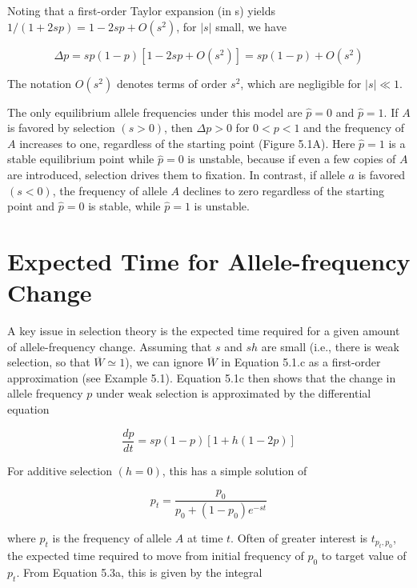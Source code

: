\documentclass{article}
\begin{document}
Noting that a first-order Taylor expansion (in s) yields  $ 1/(1+2sp)=1-2sp+O(s^{2}) $, for  $ |s| $ small, we have

\begin{equation}
\Delta p=sp(1-p)\left[1-2sp+O(s^{2})\right]=sp(1-p)+O(s^{2})
\tag{5.2b}
\label{eq:5_2b}
\end{equation}

The notation  $ O(s^2) $ denotes terms of order  $ s^2 $, which are negligible for  $ |s| \ll 1 $.

The only equilibrium allele frequencies under this model are  $ \hat{p} = 0 $ and  $ \hat{p} = 1 $. If  $ A $ is favored by selection  $ (s > 0) $, then  $ \Delta p > 0 $ for  $ 0 < p < 1 $ and the frequency of  $ A $ increases to one, regardless of the starting point (Figure 5.1A). Here  $ \hat{p} = 1 $ is a stable equilibrium point while  $ \hat{p} = 0 $ is unstable, because if even a few copies of  $ A $ are introduced, selection drives them to fixation. In contrast, if allele  $ a $ is favored  $ (s < 0) $, the frequency of allele  $ A $ declines to zero regardless of the starting point and  $ \hat{p} = 0 $ is stable, while  $ \hat{p} = 1 $ is unstable.

\section{Expected Time for Allele-frequency Change}
A key issue in selection theory is the expected time required for a given amount of allele-frequency change. Assuming that $s$ and $sh$ are small (i.e., there is weak selection, so that $\overline{W} \simeq 1$), we can ignore $\overline{W}$ in Equation 5.1.c as a first-order approximation (see Example 5.1). Equation 5.1c then shows that the change in allele frequency $p$ under weak selection is approximated by the differential equation

\begin{equation}
\frac{dp}{dt}=sp(1-p)[1+h(1-2p)]
\tag{5.3a}
\label{eq:5_3a}
\end{equation}

For additive selection  $ (h = 0) $, this has a simple solution of

\begin{equation}
p_{t}=\frac{p_{0}}{p_{0}+(1-p_{0})e^{-st}}
\tag{5.3b}
\label{eq:5_3b}
\end{equation}

where  $ p_t $ is the frequency of allele  $ A $ at time  $ t $. Often of greater interest is  $ t_{p_t,p_0} $, the expected time required to move from initial frequency of  $ p_0 $ to target value of  $ p_t $. From Equation 5.3a, this is given by the integral
\end{document}
